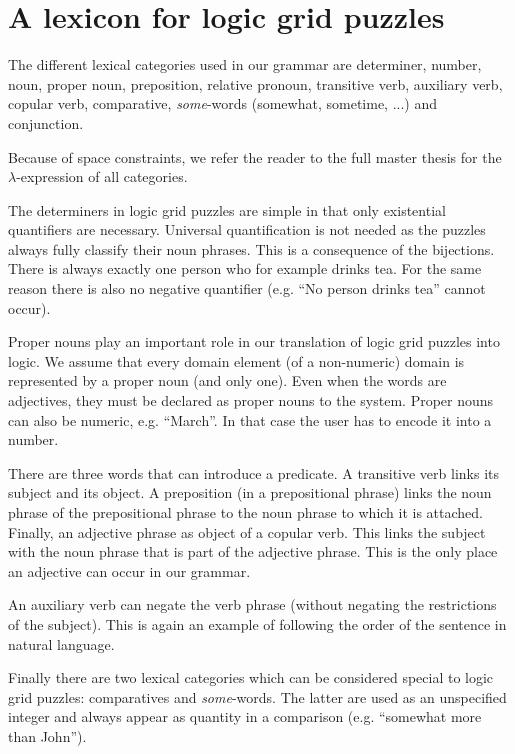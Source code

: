 \section{A lexicon for logic grid puzzles}
The different lexical categories used in our grammar are determiner, number, noun, proper noun, preposition, relative pronoun, transitive verb, auxiliary verb, copular verb, comparative, \textit{some}-words (somewhat, sometime, ...) and conjunction.

Because of space constraints, we refer the reader to the full master thesis for the $\lambda$-expression of all categories.

The determiners in logic grid puzzles are simple in that only existential quantifiers are necessary. Universal quantification is not needed as the puzzles always fully classify their noun phrases. This is a consequence of the bijections. There is always exactly one person who for example drinks tea. For the same reason there is also no negative quantifier (e.g. ``No person drinks tea'' cannot occur).

Proper nouns play an important role in our translation of logic grid puzzles into logic. We assume that every domain element (of a non-numeric) domain is represented by a proper noun (and only one). Even when the words are adjectives, they must be declared as proper nouns to the system.
Proper nouns can also be numeric, e.g. ``March''. In that case the user has to encode it into a number.

There are three words that can introduce a predicate. A transitive verb links its subject and its object. A preposition (in a prepositional phrase) links the noun phrase of the prepositional phrase to the noun phrase to which it is attached. Finally, an adjective phrase as object of a copular verb. This links the subject with the noun phrase that is part of the adjective phrase. This is the only place an adjective can occur in our grammar.


An auxiliary verb can negate the verb phrase (without negating the restrictions of the subject). This is again an example of following the order of the sentence in natural language.


Finally there are two lexical categories which can be considered special to logic grid puzzles: comparatives and \textit{some}-words. The latter are used as an unspecified integer and always appear as quantity in a comparison (e.g. ``somewhat more than John'').
